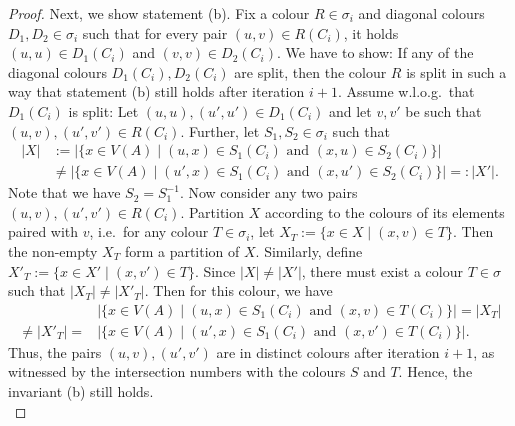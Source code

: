 \documentclass[a4paper,UKenglish,cleveref, autoref, thm-restate]{lipics-v2021}
\begin{document}
\begin{proof}
			Next, we show statement (b). Fix a colour $R \in \sigma_i$ and diagonal colours $D_1,D_2 \in \sigma_i$ such that for every pair $(u,v) \in R(C_i)$, it holds $(u,u) \in D_1(C_i)$ and $(v,v) \in D_2(C_i)$. We have to show: If any of the diagonal colours $D_1(C_i), D_2(C_i)$ are split, then the colour $R$ is split in such a way that statement (b) still holds after iteration $i+1$.
			Assume w.l.o.g.\ that $D_1(C_i)$ is split: Let $(u,u),(u',u') \in D_1(C_i)$ and let $v,v'$ be such that $(u,v), (u',v') \in R(C_i)$. Further, let $S_1, S_2 \in \sigma_i$ such that
			\begin{align*}
				|X | &:= |\{ x \in V(A) \mid (u,x) \in S_1(C_i) \text{ and } (x,u) \in S_2(C_i)  \}|\\
				& \neq |\{ x \in V(A) \mid (u',x) \in S_1(C_i) \text{ and } (x,u') \in S_2(C_i) \}| =: | X' | .
			\end{align*}
			Note that we have $S_2 = S_1^{-1}$.
			Now consider any two pairs $(u,v), (u',v') \in R(C_i)$. Partition $X$ according to the colours of its elements paired with $v$, i.e.\ for any colour $T \in \sigma_i$, let $X_T := \{ x \in X \mid (x,v) \in T \}$. Then the non-empty $X_T$ form a partition of $X$. Similarly, define $X'_T := \{ x \in X' \mid (x,v') \in T \}$. Since $|X| \neq |X'|$, there must exist a colour $T \in \sigma$ such that $|X_T| \neq |X'_T|$. Then for this colour, we have 
			\begin{align*}
				&|\{ x \in V(A) \mid (u,x) \in S_1(C_i) \text{ and } (x,v) \in T(C_i)  \}| = |X_T| \\
				\neq |X'_T| = &|\{ x \in V(A) \mid (u',x) \in S_1(C_i) \text{ and } (x,v') \in T(C_i) \}|.
			\end{align*}
			Thus, the pairs $(u,v), (u',v')$ are in distinct colours after iteration $i+1$, as witnessed by the intersection numbers with the colours $S$ and $T$. Hence, the invariant (b) still holds.\\
			

\end{proof}
\end{document}
